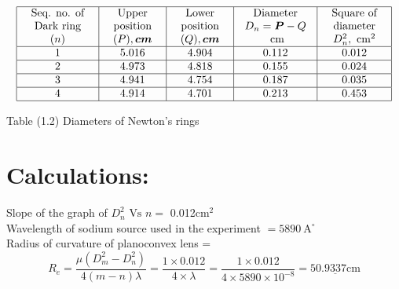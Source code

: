 \documentclass[11pt]{article}
\begin{document}
	\begin{table}[H]
		\centering
		$$
		\begin{array}{|c|c|c|c|c|}
			\hline \begin{array}{c}
				\text { Seq. no. of } \\
				\text { Dark ring } \\
				(n)
			\end{array} & \begin{array}{c}
				\text { Upper } \\
				\text { position } \\
				(P), \boldsymbol{c m}
			\end{array} & \begin{array}{c}
				\text { Lower } \\
				\text { position } \\
				(Q), \boldsymbol{c m}
			\end{array} & \begin{array}{c}
				\text { Diameter } \\
				D_{n} = \boldsymbol{P}-Q \\
				\mathrm{~cm}
			\end{array} & \begin{array}{c}
				\text { Square of } \\
				\text { diameter } \\
				D_{n}^{2}, \mathrm{~cm}^{2}
			\end{array} \\
			\hline 1 & 5.016 & 4.904 & 0.112 & 0.012 \\
			\hline 2 & 4.973 & 4.818 & 0.155 & 0.024\\
			\hline 3 & 4.941 & 4.754 & 0.187 & 0.035\\
			\hline 4 & 4.914 & 4.701 & 0.213 & 0.453\\
			\hline
		\end{array}
		$$
	\caption{Table (1.2) Diameters of Newton's rings}
	\end{table}
	\section{Calculations:}
	
	
	Slope of the graph of $D_{n}^{2} \text{  Vs  } n=$ 0.012$ \mathrm{ cm}^{2}$\\
	Wavelength of sodium source used in the experiment $=5890 \mathrm{~A}^{\circ}$\\
	Radius of curvature of planoconvex lens = \\
	$$
	R_{e}=\frac{\mu\left(D_{m}^{2}-D_{n}^{2}\right)}{4(m-n) \lambda}=\frac{1 \times 0.012}{4 \times \lambda}=\frac{1 \times 0.012}{4 \times 5890 \times 10^{-8}}=\underline{50.9337 \mathrm{ cm}}
	$$
\end{document}
